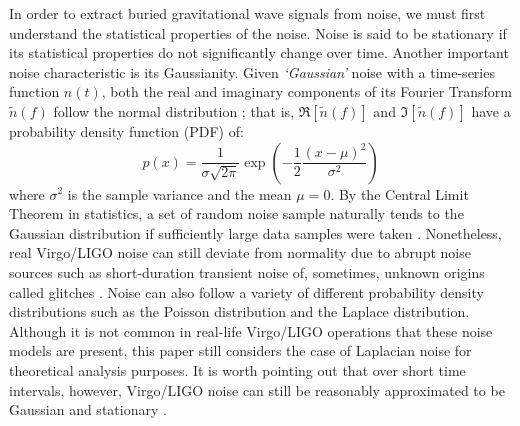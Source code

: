 \documentclass[reprint,
letterpaper,
 amsmath,amssymb,
 aps,
]{revtex4-2}
\begin{document}
In order to extract buried gravitational wave signals from noise, we must first understand the statistical properties of the noise. Noise is said to be stationary if its statistical properties do not significantly change over time. Another important noise characteristic is its Gaussianity. Given \textit{`Gaussian'} noise with a time-series function $n(t)$, both the real and imaginary components of its Fourier Transform $\widetilde{n}(f)$ follow the normal distribution \cite{yamamoto}; that is, $\Re[\widetilde{n}(f)]$ and  $\Im{[\widetilde{n}(f)]}$ have a probability density function (PDF) of:
\begin{equation}
    p(x) = \frac{1}{\sigma\sqrt{2\pi}}\exp{\left(-\frac{1}{2}\frac{(x-\mu)^2}{\sigma^2}\right)}
\end{equation}
where $\sigma^2$ is the sample variance and the mean $\mu = 0$. By the Central Limit Theorem in statistics, a set of random noise sample naturally tends to the Gaussian distribution if sufficiently large data samples were taken \cite{jaranowski2007gravitationalwave}. Nonetheless, real Virgo/LIGO noise can still deviate from normality due to abrupt noise sources such as short-duration transient noise of, sometimes, unknown origins called glitches \cite{ultimate}. Noise can also follow a variety of different probability density distributions such as the Poisson distribution and the Laplace distribution. Although it is not common in real-life Virgo/LIGO operations that these noise models are present, this paper still considers the case of Laplacian noise for theoretical analysis purposes. It is worth pointing out that over short time intervals, however, Virgo/LIGO noise can still be reasonably approximated to be Gaussian and stationary \cite{collaboration2019open}.
\end{document}
